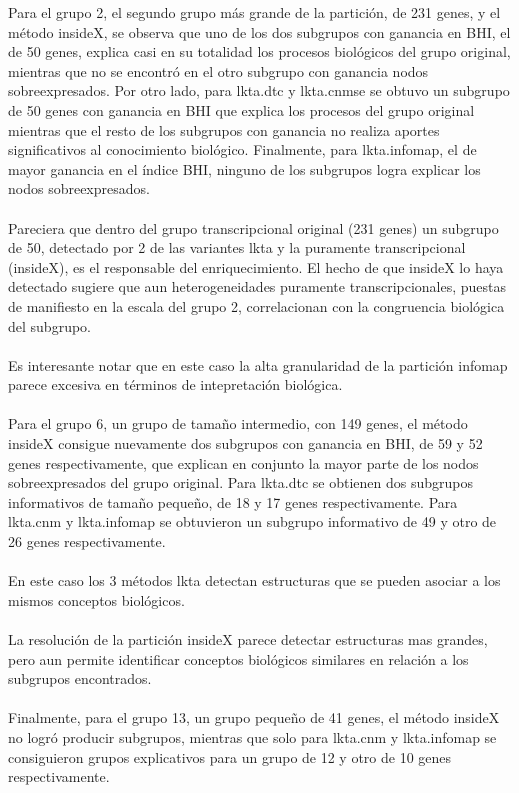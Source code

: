 Para el grupo 2, el segundo grupo más grande de la partición, de 231 genes, y el método insideX, se observa que uno de los dos subgrupos con ganancia en BHI, el de 50 genes, explica casi en su totalidad los procesos biológicos del grupo original, mientras que no se encontró en el otro subgrupo con ganancia nodos sobreexpresados. Por otro lado, para lkta.dtc y lkta.cnmse se obtuvo un subgrupo de 50 genes con ganancia en BHI que explica los procesos del grupo original mientras que el resto de los subgrupos con ganancia no realiza aportes significativos al conocimiento biológico. Finalmente, para lkta.infomap, el de mayor ganancia en el índice BHI, ninguno de los subgrupos logra explicar los nodos sobreexpresados.\\\\
Pareciera que dentro del grupo transcripcional original (231 genes) un subgrupo de 50, detectado por 2 de las variantes lkta y la puramente transcripcional (insideX), es el responsable del enriquecimiento. El hecho de que insideX lo haya detectado sugiere que aun heterogeneidades puramente transcripcionales, puestas de manifiesto en la escala del grupo 2, correlacionan con la congruencia biológica del subgrupo.\\\\
Es interesante notar que en este caso la alta granularidad de la partición infomap parece excesiva en términos de intepretación biológica.\\\\
Para el grupo 6, un grupo de tamaño intermedio, con 149 genes, el método insideX consigue nuevamente dos subgrupos con ganancia en BHI, de 59 y 52 genes respectivamente, que explican en conjunto la mayor parte de los nodos sobreexpresados del grupo original. Para lkta.dtc se obtienen dos subgrupos informativos de tamaño pequeño, de 18 y 17 genes respectivamente. Para lkta.cnm y lkta.infomap se obtuvieron un subgrupo informativo de 49 y otro de 26 genes respectivamente.\\\\
En este caso los 3 métodos lkta detectan estructuras que se pueden asociar a los mismos conceptos biológicos.\\\\
La resolución de la partición insideX parece detectar estructuras mas grandes, pero aun permite identificar conceptos biológicos similares en relación a los subgrupos encontrados.\\\\
Finalmente, para el grupo 13, un grupo pequeño de 41 genes, el método insideX no logró producir subgrupos, mientras que solo para lkta.cnm y lkta.infomap se consiguieron grupos explicativos para un grupo de 12 y otro de 10 genes respectivamente.\\\\
